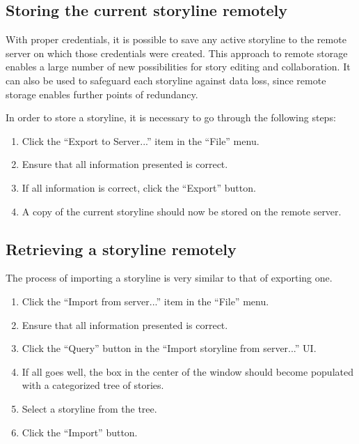 \documentclass[12pt,letterpaper]{article}
\begin{document}

\subsection{Storing the current storyline remotely}
With proper credentials, it is possible to save any active storyline to the remote server on which those credentials
were created. This approach to remote storage enables a large number of new possibilities for story editing and collaboration.
It can also be used to safeguard each storyline against data loss, since remote storage enables further points of redundancy.

In order to store a storyline, it is necessary to go through the following steps:
\begin{enumerate}
\item Click the ``Export to Server...'' item in the ``File'' menu. 
\item Ensure that all information presented is correct.
\item If all information is correct, click the ``Export'' button.
\item A copy of the current storyline should now be stored on the remote server.
\end{enumerate}

\subsection{Retrieving a storyline remotely}
The process of importing a storyline is very similar to that of exporting one.

\begin{enumerate}
\item Click the ``Import from server...'' item in the ``File'' menu.
\item Ensure that all information presented is correct.
\item Click the ``Query'' button in the ``Import storyline from server...'' UI.
\item If all goes well, the box in the center of the window should become populated with a categorized tree of stories.
\item Select a storyline from the tree.
\item Click the ``Import'' button.
\end{enumerate}
\end{document}
